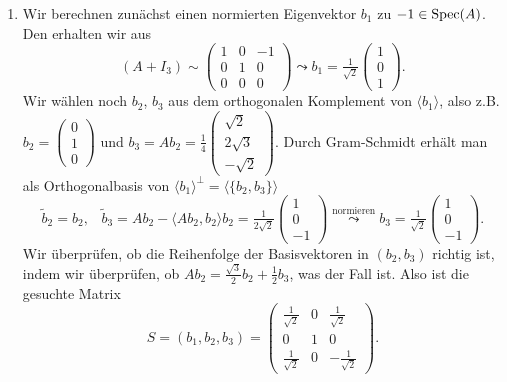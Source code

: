 \begin{enumerate}
	\item Wir berechnen zunächst einen normierten Eigenvektor \( b_1 \) zu \( -1 \in \text{Spec}(A) \). Den erhalten wir aus
	\begin{equation*}
		(A+I_3) \sim \left( \begin{smallmatrix}
			1 & 0 & -1 \\
			0 & 1 & 0 \\
			0 & 0 & 0 
		\end{smallmatrix} \right) \leadsto b_1 = \tfrac{1}{\sqrt{2}}\left( \begin{smallmatrix}
			1 \\ 0 \\ 1
		\end{smallmatrix} \right)\text{.}
	\end{equation*}
	Wir wählen noch \( b_2 \), \( b_3 \) aus dem orthogonalen Komplement von \( \langle b_1 \rangle \), also z.B. \( b_2 = \left( \begin{smallmatrix}
		0 \\ 1 \\ 0
	\end{smallmatrix} \right) \) und \( b_3 = Ab_2 = \tfrac{1}{4}\left( \begin{smallmatrix}
		\sqrt{2} \\ 2\sqrt{3} \\ -\sqrt{2}
	\end{smallmatrix} \right) \). Durch Gram-Schmidt erhält man als Orthogonalbasis von \( \langle b_1 \rangle^\perp = \langle \{ b_2, b_3 \} \rangle \)
	\begin{equation*}
		\widetilde{b}_2 = b_2\text{,} \quad \widetilde{b}_3 = Ab_2 - \langle Ab_2,b_2 \rangle b_2 = \tfrac{1}{2\sqrt{2}}\left( \begin{smallmatrix}
			1 \\ 0 \\ -1
		\end{smallmatrix} \right) \overset{\text{normieren}}{\leadsto} b_3 = \tfrac{1}{\sqrt{2}}\left( \begin{smallmatrix}
			1 \\ 0 \\ -1
		\end{smallmatrix} \right)\text{.}
	\end{equation*}
	Wir überprüfen, ob die Reihenfolge der Basisvektoren in \( (b_2, b_3) \) richtig ist, indem wir überprüfen, ob \( Ab_2 = \tfrac{\sqrt{3}}{2}b_2+\tfrac{1}{2}b_3 \), was der Fall ist. Also ist die gesuchte Matrix
	\begin{equation*}
		S = (b_1,b_2,b_3) = \begin{pmatrix}
			\tfrac{1}{\sqrt{2}} & 0 & \tfrac{1}{\sqrt{2}} \\
			0 & 1 & 0 \\
			\tfrac{1}{\sqrt{2}} & 0 & -\tfrac{1}{\sqrt{2}}
		\end{pmatrix}\text{.}
	\end{equation*}
\end{enumerate}

